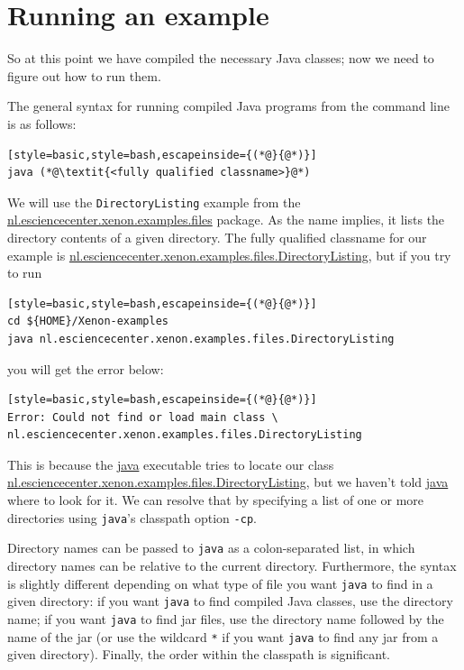 \documentclass[12pt, a4paper, twoside, openany, titlepage]{book}
\begin{document}
\section{Running an example}

So at this point we have compiled the necessary Java classes; now we need to figure out how to run them.

The general syntax for running compiled Java programs from the command line is as follows:
\begin{lstlisting}[style=basic,style=bash,escapeinside={(*@}{@*)}]
java (*@\textit{<fully qualified classname>}@*)
\end{lstlisting}
We will use the \texttt{DirectoryListing} example from the \url{nl.esciencecenter.xenon.examples.files} package. As the name implies, it lists the directory contents of a given directory. The fully qualified classname for our example is \url{nl.esciencecenter.xenon.examples.files.DirectoryListing}, but if you try to run
\begin{lstlisting}[style=basic,style=bash,escapeinside={(*@}{@*)}]
cd ${HOME}/Xenon-examples
java nl.esciencecenter.xenon.examples.files.DirectoryListing
\end{lstlisting} %
you will get the error below:
\begin{lstlisting}[style=basic,style=bash,escapeinside={(*@}{@*)}]
Error: Could not find or load main class \
nl.esciencecenter.xenon.examples.files.DirectoryListing
\end{lstlisting}

This is because the \url{java} executable tries to locate our class \url{nl.esciencecenter.xenon.examples.files.DirectoryListing}, but we haven't told \url{java} where to look for it. We can resolve that by specifying a list of one or more directories using \texttt{java}'s classpath option \texttt{-cp}.

Directory names can be passed to \texttt{java} as a colon-separated list, in which directory names can be relative to the current directory. Furthermore, the syntax is slightly different depending on what type of file you want \texttt{java} to find in a given directory: if you want \texttt{java} to find compiled Java classes, use the directory name; if you want \texttt{java} to find jar files, use the directory name followed by the name of the jar (or use the wildcard \texttt{*} if you want \texttt{java} to find any jar from a given directory). Finally, the order within the classpath is significant.
\end{document}

